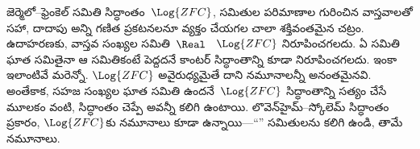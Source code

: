 \documentclass[../../../include/open-logic-section]{subfiles}
\begin{document}
\begin{ex}[స్కోలెమ్ విరోధాభాసం]
జెర్మెలో--ఫ్రెంకెల్ సమితి సిద్ధాంతం~$\Log{ZFC}$, సమితుల పరిమాణాల
గురించిన వాస్తవాలతో సహా, దాదాపు అన్ని గణిత ప్రకటనలనూ వ్యక్తం చేయగల
చాలా శక్తివంతమైన చట్రం. ఉదాహరణకు, వాస్తవ సంఖ్యల సమితి~$\Real$
~$\Log{ZFC}$ నిరూపించగలదు. ఏ సమితి ఘాత సమితైనా
ఆ సమితికంటే పెద్దదనే కాంటర్ సిద్ధాంతాన్ని కూడా నిరూపించగలదు. ఇంకా
ఇలాంటివే మరెన్నో. $\Log{ZFC}$ అవైరుధ్యమైతే దాని నమూనాలన్నీ అనంతమైనవి.
అంతేకాక, సహజ సంఖ్యల ఘాత సమితి ఉందనే~$\Log{ZFC}$ సిద్ధాంతాన్ని సత్యం
చేసే మూలకం వంటి,  సిద్ధాంతం చెప్పే 
అవన్నీ కలిగి ఉంటాయి. లొవెన్‌హైమ్--స్కోలెమ్ సిద్ధాంతం ప్రకారం,
$\Log{ZFC}$కు  నమూనాలు కూడా ఉన్నాయి---``''
సమితులను కలిగి ఉండి, తామే  నమూనాలు.
\end{ex}
\end{document}
